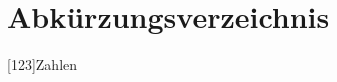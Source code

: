 \chapter*{Abkürzungsverzeichnis}
\thispagestyle{empty}
\pagestyle{empty}

\begin{acronym}[WebRTC]
  [123]{Zahlen}
\end{acronym}
\pagestyle{scrheadings}